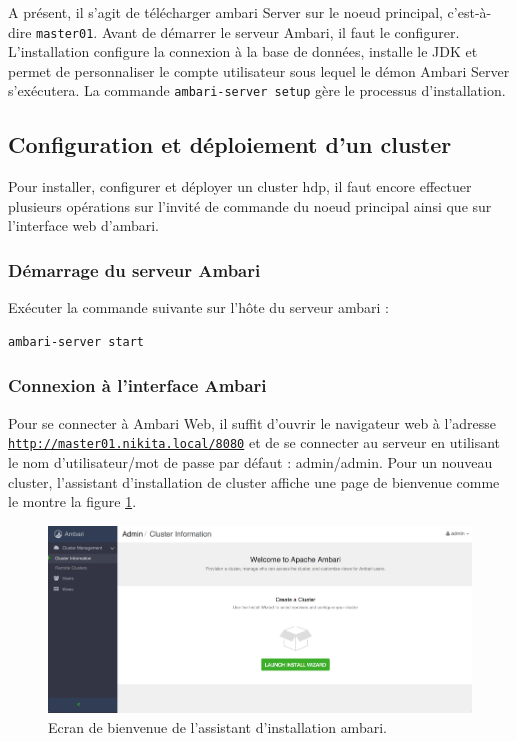 \documentclass[12pt, french]{report}
\begin{document}
A présent, il s'agit de télécharger \gls{ambari} Server sur le noeud principal, c'est-à-dire \texttt{master01}. Avant de démarrer le serveur Ambari, il faut le configurer. L'installation configure la connexion à la base de données, installe le JDK et permet de personnaliser le compte utilisateur sous lequel le démon Ambari Server s'exécutera. La commande \texttt{ambari-server setup} gère le processus d'installation.

\subsection{Configuration et déploiement d'un cluster}

Pour installer, configurer et déployer un cluster \gls{hdp}, il faut encore effectuer plusieurs opérations sur l'invité de commande du noeud principal ainsi que sur l'interface web d'\gls{ambari}.

\subsubsection{Démarrage du serveur Ambari}

Exécuter la commande suivante sur l'hôte du serveur \gls{ambari} :

\begin{verbatim}
ambari-server start
\end{verbatim}

\subsubsection{Connexion à l'interface Ambari}

Pour se connecter à Ambari Web, il suffit d'ouvrir le navigateur web à l'adresse \texttt{\href{http://master01.nikita.local/8080}{http://master01.nikita.local/8080}} et de se connecter au serveur en utilisant le nom d'utilisateur/mot de passe par défaut : admin/admin. Pour un nouveau cluster, l'assistant d'installation de cluster affiche une page de bienvenue comme le montre la figure \ref{fig:wizard-ambari}.

\begin{figure}[h]
\includegraphics[scale=0.6]{assets/img/ambari-wizard.png}
\centering
\caption{Ecran de bienvenue de l'assistant d'installation \gls{ambari}.}
\label{fig:wizard-ambari}
\end{figure}
\end{document}
